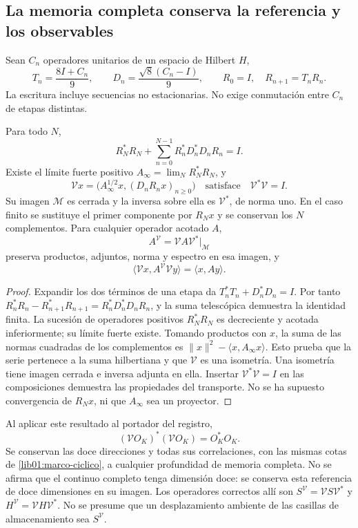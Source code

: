 \subsection{La memoria completa conserva la referencia y los observables}
\label{lib01:memoria-completa}

Sean \(C_n\) operadores unitarios de un espacio de Hilbert \(H\),
\[
 T_n=\frac{8I+C_n}{9},\qquad
 D_n=\frac{\sqrt8(C_n-I)}9,\qquad
 R_0=I,\quad R_{n+1}=T_nR_n.
\]
La escritura incluye secuencias no estacionarias. No exige conmutación
entre \(C_n\) de etapas distintas.

\begin{theorem}
\label{lib01:isometria}
Para todo \(N\),
\[
 R_N^*R_N+\sum_{n=0}^{N-1}R_n^*D_n^*D_nR_n=I.
\]
Existe el límite fuerte positivo
\(A_\infty=\lim_N R_N^*R_N\), y
\begin{equation}
 \mathcal Vx=
 \bigl(A_\infty^{1/2}x,(D_nR_nx)_{n\geq0}\bigr)
 \quad\text{satisface}\quad\mathcal V^*\mathcal V=I.
 \label{lib01:V-infinita}
\end{equation}
Su imagen \(\mathcal M\) es cerrada y la inversa sobre ella es
\(\mathcal V^*\), de norma uno. En el caso finito se sustituye el
primer componente por \(R_Nx\) y se conservan los \(N\)
complementos. Para cualquier operador acotado \(A\),
\[
 A^{\mathcal V}=\mathcal VA\mathcal V^*\big|_{\mathcal M}
\]
preserva productos, adjuntos, norma y espectro en esa imagen, y
\[
 \langle\mathcal Vx,A^{\mathcal V}\mathcal Vy\rangle
 =\langle x,Ay\rangle.
\]
\end{theorem}
\begin{proof}
Expandir los dos términos de una etapa da
\(T_n^*T_n+D_n^*D_n=I\). Por tanto
\(R_n^*R_n-R_{n+1}^*R_{n+1}=R_n^*D_n^*D_nR_n\), y la suma
telescópica demuestra la identidad finita. La sucesión de operadores
positivos \(R_N^*R_N\) es decreciente y acotada inferiormente; su
límite fuerte existe. Tomando productos con \(x\), la suma de las
normas cuadradas de los complementos es
\(\|x\|^2-\langle x,A_\infty x\rangle\). Esto prueba que la
serie pertenece a la suma hilbertiana y que \(\mathcal V\) es una
isometría. Una isometría tiene imagen cerrada e inversa adjunta en ella.
Insertar \(\mathcal V^*\mathcal V=I\) en las composiciones demuestra
las propiedades del transporte. No se ha supuesto convergencia de
\(R_Nx\), ni que \(A_\infty\) sea un proyector.
\end{proof}

Al aplicar este resultado al portador del registro,
\begin{equation}
 (\mathcal VO_K)^*(\mathcal VO_K)=O_K^*O_K.
 \label{lib01:gram-memoria}
\end{equation}
Se conservan las doce direcciones y todas sus correlaciones, con las
mismas cotas de \cref{lib01:marco-ciclico}, a cualquier profundidad de
memoria completa. No se afirma que el continuo completo tenga dimensión
doce: se conserva esta referencia de doce dimensiones en su imagen.
Los operadores correctos allí son
\(S^{\mathcal V}=\mathcal VS\mathcal V^*\) y
\(H^{\mathcal V}=\mathcal VH\mathcal V^*\). No se presume que un
desplazamiento ambiente de las casillas de almacenamiento sea
\(S^{\mathcal V}\).

